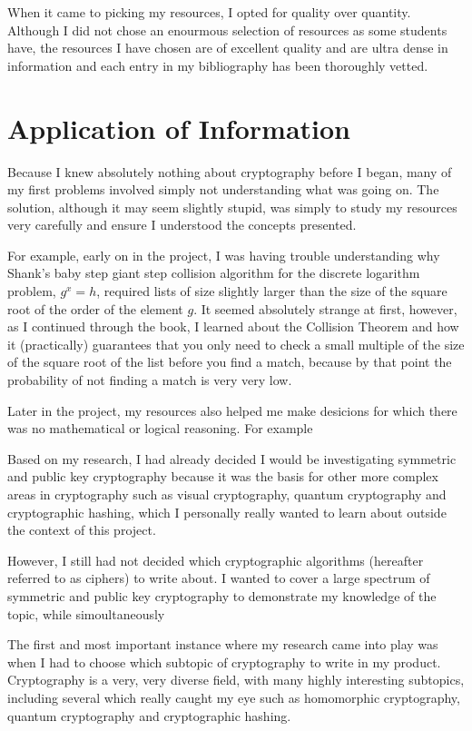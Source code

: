 \documentclass[12pt, a4paper, draft]{report}
\begin{document}
When it came to picking my resources, I opted for quality over quantity.
Although I did not chose an enourmous selection of resources as some
students have, the resources I have chosen are of excellent quality and
are ultra dense in information and each entry in my bibliography has
been thoroughly vetted.

\section{Application of Information}

Because I knew absolutely nothing about cryptography before I began,
many of my first problems involved simply not understanding what was
going on. The solution, although it may seem slightly stupid, was
simply to study my resources very carefully and ensure I understood
the concepts presented.

For example, early on in the project, I was having trouble understanding
why Shank's baby step giant step collision algorithm for the discrete
logarithm problem, $g^x = h$, required lists of size slightly larger than
the size of the square root of the order of the element $g$. It seemed
absolutely strange at first, however, as I continued through the book, I
learned about the Collision Theorem and how it (practically) guarantees
that you only need to check a small multiple of the size of the square
root of the list before you find a match, because by that point the
probability of not finding a match is very very low.


Later in the project, my resources also helped me make desicions for
which there was no mathematical or logical reasoning. For example


Based on my research, I had already decided I would be investigating
symmetric and public key cryptography because it was the basis
for other more complex areas in cryptography such as visual
cryptography, quantum cryptography and cryptographic hashing, which
I personally really wanted to learn about outside the context of
this project.

However, I still had not decided which cryptographic algorithms
(hereafter referred to as ciphers) to write about.
I wanted to cover
a large spectrum of symmetric and public key cryptography to
demonstrate my knowledge of the topic, while simoultaneously

The first and most important instance where my research came into play
was when I had to choose which subtopic of cryptography to write in my
product. Cryptography is a very, very diverse field, with many highly
interesting subtopics, including several which really caught my eye
such as homomorphic cryptography, quantum cryptography and
cryptographic hashing.
\end{document}
